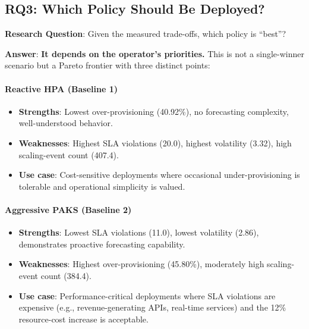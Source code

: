 \subsection{RQ3: Which Policy Should Be Deployed?}
\label{sec:evalThree}

\textbf{Research Question}: Given the measured trade-offs, which policy is ``best''?

\textbf{Answer}: \textbf{It depends on the operator's priorities.} This is not a single-winner scenario but a Pareto frontier with three distinct points:

\paragraph{Reactive HPA (Baseline 1)}
\begin{itemize}
  \item \textbf{Strengths}: Lowest over-provisioning (40.92\%), no forecasting complexity, well-understood behavior.
  \item \textbf{Weaknesses}: Highest SLA violations (20.0), highest volatility (3.32), high scaling-event count (407.4).
  \item \textbf{Use case}: Cost-sensitive deployments where occasional under-provisioning is tolerable and operational simplicity is valued.
\end{itemize}

\paragraph{Aggressive PAKS (Baseline 2)}
\begin{itemize}
  \item \textbf{Strengths}: Lowest SLA violations (11.0), lowest volatility (2.86), demonstrates proactive forecasting capability.
  \item \textbf{Weaknesses}: Highest over-provisioning (45.80\%), moderately high scaling-event count (384.4).
  \item \textbf{Use case}: Performance-critical deployments where SLA violations are expensive (e.g., revenue-generating APIs, real-time services) and the 12\% resource-cost increase is acceptable.
\end{itemize}

